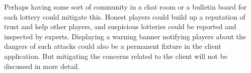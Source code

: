 Perhaps having some sort of community in a chat room or a bulletin board for each lottery could mitigate this. Honest players could build up a reputation of trust and help other players, and suspicious lotteries could be reported and inspected by experts. Displaying a warning banner notifying players about the dangers of such attacks could also be a permanent fixture in the client application. But mitigating the concerns related to the client will not be discussed in more detail.
